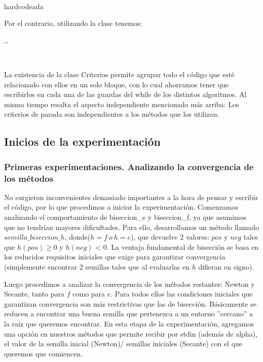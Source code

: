 ~

hardcodeada
~

Por el contrario, utilizando la clase tenemos:

\begin{algorithmic}
	\While{$!criterios.parar(parametros)$}
		\State \ldots
	\EndWhile
\end{algorithmic}

~

La existencia de la clase Criterios permite agrupar todo el código que esté relacionado con ellos en un solo bloque, con lo cual ahorramos tener que escribirlos
en cada una de las guardas del while de los distintos algoritmos. Al mismo tiempo resalta el aspecto independiente mencionado más arriba: Los criterios de parada son 
independientes a los métodos que los utilizan.


\subsection{Inicios de la experimentación}

\subsubsection{Primeras experimentaciones. Analizando la convergencia de los métodos}

No surgieron inconvenientes demasiado importantes a la hora de pensar y escribir el código, por lo que procedimos a iniciar la experimentación.
Comenzamos analizando el comportamiento de biseccion\_e y biseccion\_f, ya que asumimos que no tendrían mayores dificultades. Para ello, desarrollamos un método llamado
$semilla\_biseccion\_h$, donde($h = f \ o \ h=e$), que devuelve 2 valores: $pos$ y $neg$ tales que $h(pos)$ y $h(neg)$ < 0. La ventaja fundamental de bisección
se basa en los reducidos requisitos iniciales que exige para garantizar convergencia (simplemente encontrar 2 semillas tales que al evaluarlas en $h$ difieran en signo).

Luego procedimos a analizar la convergencia de los métodos restantes: Newton y Secante, tanto para $f$ como para $e$. Para todos ellos las condiciones iniciales que garantizan
convergencia son más restrictivas que las de bisección. Básicamente se reducen a encontrar una buena semilla que pertenezca a un entorno ''cercano'' a la raíz que queremos encontrar.
En esta etapa de la experimentación, agregamos una opción en nuestros métodos que permite recibir por stdin (además de alpha), el valor de la semilla inicial (Newton)/ semillas iniciales (Secante)
con el que queremos que comiencen. 


